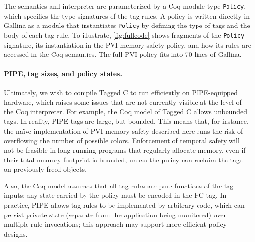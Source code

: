 \documentclass{llncs}
\begin{document}
The semantics and interpreter are parameterized by a Coq module type {\tt Policy}, which specifies
the type signatures of the tag rules. A policy is written directly in Gallina as a module that
instantiates {\tt Policy} by defining the type of tags and the body of each tag rule.  
To illustrate, \cref{fig:fullcode} shows fragments of the {\tt Policy} signature, its instantiation
in the PVI memory safety policy, and how its rules are accessed in the Coq semantics. The full
PVI policy fits into 70 lines of Gallina.  

\paragraph{PIPE, tag sizes, and policy states.}
Ultimately, we wish to compile Tagged C to run efficiently on PIPE-equipped hardware, which
raises some issues that are not currently visible at the level of the Coq interpreter. For example,
the Coq model of Tagged C allows unbounded tags. In reality, PIPE tags are large, but
bounded. This means that, for instance, the na\"{i}ve implementation of PVI memory safety
described here runs the risk of overflowing the number of possible colors. 
Enforcement of temporal safety will not be feasible in long-running programs that regularly allocate memory,
even if their total memory footprint is bounded, unless the policy can reclaim the tags
on previously freed objects. 

Also, the Coq model assumes that all tag rules are pure functions of the tag inputs;
any state carried by the policy must be encoded in the PC tag.
In practice, PIPE allows tag rules to be implemented by arbitrary code, which can  persist
private state (separate from the application being monitored) over multiple
rule invocations; this approach may support more efficient policy designs.
\end{document}
